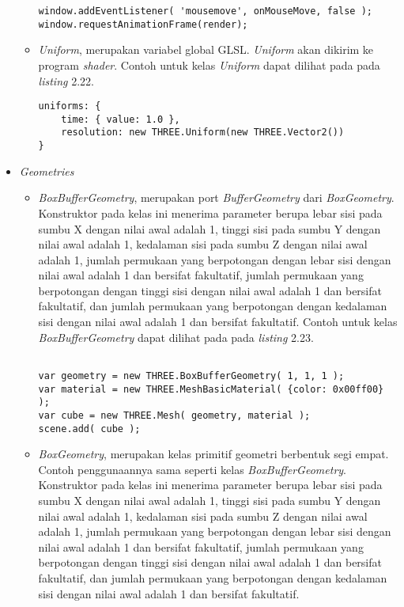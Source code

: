 \begin{itemize}
\begin{itemize}
\begin{lstlisting}[caption={Contoh penggunaan kelas {\it Raycaster}.},captionpos=b]
window.addEventListener( 'mousemove', onMouseMove, false );
window.requestAnimationFrame(render);
\end{lstlisting}
	
	\item{\it Uniform}, merupakan variabel global GLSL. {\it Uniform} akan dikirim ke program {\it shader}. Contoh untuk kelas {\it Uniform} dapat dilihat pada pada {\it listing} 2.22.
	
\begin{lstlisting}[caption={Contoh penggunaan kelas {\it Uniform} yang diinisialisasi dengan nilai atau objek.},captionpos=b]
uniforms: {
	time: { value: 1.0 },
	resolution: new THREE.Uniform(new THREE.Vector2())
}
\end{lstlisting}
	
	\end{itemize}
	
\item \textit{Geometries}
	\begin{itemize}
	\item {\it BoxBufferGeometry}, merupakan port {\it BufferGeometry} dari {\it BoxGeometry}. Konstruktor pada kelas ini menerima parameter berupa lebar sisi pada sumbu X dengan nilai awal adalah 1, tinggi sisi pada sumbu Y dengan nilai awal adalah 1, kedalaman sisi pada sumbu Z dengan nilai awal adalah 1, jumlah permukaan yang berpotongan dengan lebar sisi dengan nilai awal adalah 1 dan bersifat fakultatif,  jumlah permukaan yang berpotongan dengan tinggi sisi dengan nilai awal adalah 1 dan bersifat fakultatif,  dan jumlah permukaan yang berpotongan dengan kedalaman sisi dengan nilai awal adalah 1 dan bersifat fakultatif. Contoh untuk kelas {\it BoxBufferGeometry} dapat dilihat pada pada {\it listing} 2.23.
	
\begin{lstlisting}[caption={Contoh penggunaan kelas {\it BoxBufferGeometry}.},captionpos=b]

var geometry = new THREE.BoxBufferGeometry( 1, 1, 1 );
var material = new THREE.MeshBasicMaterial( {color: 0x00ff00} );
var cube = new THREE.Mesh( geometry, material );
scene.add( cube );
\end{lstlisting}

	\item {\it BoxGeometry}, merupakan kelas primitif geometri berbentuk segi empat. Contoh penggunaannya sama seperti kelas {\it BoxBufferGeometry}. Konstruktor pada kelas ini menerima parameter berupa lebar sisi pada sumbu X dengan nilai awal adalah 1, tinggi sisi pada sumbu Y dengan nilai awal adalah 1, kedalaman sisi pada sumbu Z dengan nilai awal adalah 1, jumlah permukaan yang berpotongan dengan lebar sisi dengan nilai awal adalah 1 dan bersifat fakultatif,  jumlah permukaan yang berpotongan dengan tinggi sisi dengan nilai awal adalah 1 dan bersifat fakultatif,  dan jumlah permukaan yang berpotongan dengan kedalaman sisi dengan nilai awal adalah 1 dan bersifat fakultatif.
	

\end{itemize}
\end{itemize}
